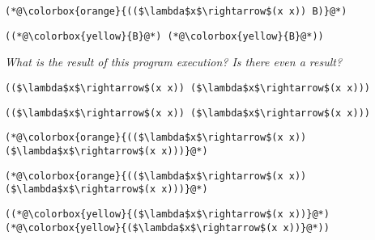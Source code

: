 \documentclass{beamer}
\begin{document}
\begin{frame}[fragile]{\CurrentSection}
\lstset{basicstyle=\ttfamily\small}\lstset{numbers=none}\lstset{language=ML}\begin{lstlisting}
(*@\colorbox{orange}{(($\lambda$x$\rightarrow$(x x)) B)}@*)
\end{lstlisting}
\pause\lstset{language=ML}\begin{lstlisting}
((*@\colorbox{yellow}{B}@*) (*@\colorbox{yellow}{B}@*))
\end{lstlisting}

\end{frame}

\begin{frame}[fragile]{\CurrentSection}
\begin{exampleblock}{}
\textit{What is the result of this program execution? Is there even a result?}
\end{exampleblock}

 
\lstset{basicstyle=\ttfamily\small}\lstset{numbers=none}\lstset{language=ML}\begin{lstlisting}
(($\lambda$x$\rightarrow$(x x)) ($\lambda$x$\rightarrow$(x x)))
\end{lstlisting}
 

\end{frame}

\begin{frame}[fragile]{\CurrentSection}
\lstset{basicstyle=\ttfamily\small}\lstset{numbers=none}\lstset{language=ML}\begin{lstlisting}
(($\lambda$x$\rightarrow$(x x)) ($\lambda$x$\rightarrow$(x x)))
\end{lstlisting}
\pause\lstset{language=ML}\begin{lstlisting}
(*@\colorbox{orange}{(($\lambda$x$\rightarrow$(x x)) ($\lambda$x$\rightarrow$(x x)))}@*)
\end{lstlisting}

\end{frame}

\begin{frame}[fragile]{\CurrentSection}
\lstset{basicstyle=\ttfamily\small}\lstset{numbers=none}\lstset{language=ML}\begin{lstlisting}
(*@\colorbox{orange}{(($\lambda$x$\rightarrow$(x x)) ($\lambda$x$\rightarrow$(x x)))}@*)
\end{lstlisting}
\pause\lstset{language=ML}\begin{lstlisting}
((*@\colorbox{yellow}{($\lambda$x$\rightarrow$(x x))}@*) (*@\colorbox{yellow}{($\lambda$x$\rightarrow$(x x))}@*))
\end{lstlisting}

\end{frame}
\end{document}
